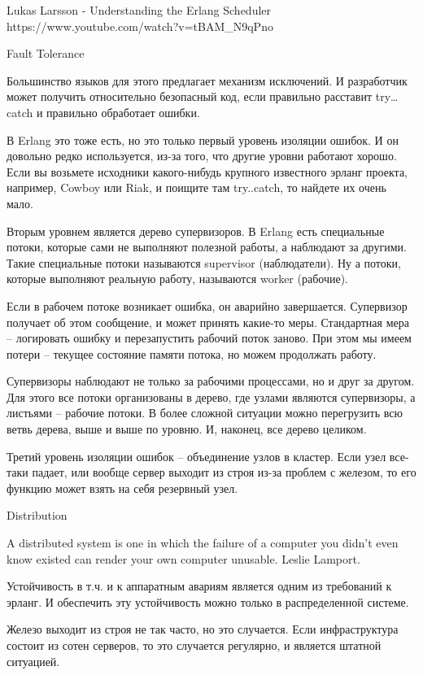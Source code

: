 \documentclass[10pt]{beamer}
\begin{document}
Lukas Larsson - Understanding the Erlang Scheduler
https://www.youtube.com/watch?v=tBAM_N9qPno


Fault Tolerance

Большинство языков для этого предлагает механизм исключений. И
разработчик может получить относительно безопасный код, если правильно
расставит try…catch и правильно обработает ошибки.

В Erlang это тоже есть, но это только первый уровень изоляции
ошибок. И он довольно редко используется, из-за того, что другие
уровни работают хорошо. Если вы возьмете исходники какого-нибудь
крупного известного эрланг проекта, например, Cowboy или Riak, и
поищите там try..catch, то найдете их очень мало.

Вторым уровнем является дерево супервизоров. В Erlang есть специальные
потоки, которые сами не выполняют полезной работы, а наблюдают за
другими. Такие специальные потоки называются supervisor
(наблюдатели). Ну а потоки, которые выполняют реальную работу,
называются worker (рабочие).

Если в рабочем потоке возникает ошибка, он аварийно
завершается. Супервизор получает об этом сообщение, и может принять
какие-то меры. Стандартная мера – логировать ошибку и перезапустить
рабочий поток заново. При этом мы имеем потери -- текущее состояние
памяти потока, но можем продолжать работу.

Супервизоры наблюдают не только за рабочими процессами, но и друг за
другом. Для этого все потоки организованы в дерево, где узлами
являются супервизоры, а листьями – рабочие потоки.  В более сложной
ситуации можно перегрузить всю ветвь дерева, выше и выше по уровню. И,
наконец, все дерево целиком.

Третий уровень изоляции ошибок – объединение узлов в кластер. Если узел
все-таки падает, или вообще сервер выходит из строя из-за проблем с
железом, то его функцию может взять на себя резервный узел.


Distribution

A distributed system is one in which the failure of a computer you didn’t even know existed can render your own computer unusable.
Leslie Lamport.

Устойчивость в т.ч. и к аппаратным авариям является одним из требований к эрланг.
И обеспечить эту устойчивость можно только в распределенной системе.

Железо выходит из строя не так часто, но это случается.
Если инфраструктура состоит из сотен серверов, то это случается регулярно, и является штатной ситуацией.
\end{document}
